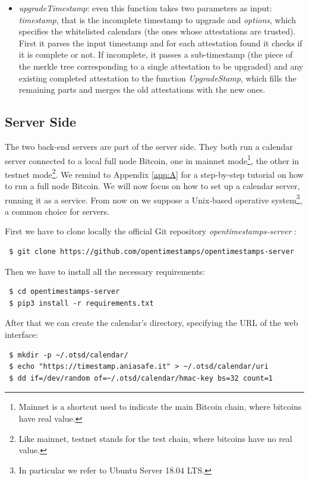\begin{itemize}
    \item \textit{upgradeTimestamp}: even this function takes two parameters as input: \textit{timestamp}, that is the incomplete timestamp to upgrade and \textit{options}, which specifies the whitelisted calendars (the ones whose attestations are trusted). First it parses the input timestamp and for each attestation found it checks if it is complete or not. If incomplete, it passes a sub-timestamp (the piece of the merkle tree corresponding to a single attestation to be upgraded) and any existing completed attestation to the function \textit{UpgradeStamp}, which fills the remaining parts and merges the old attestations with the new ones.
\end{itemize}

\bigskip
\subsection{Server Side}
\label{sec:server-side}
The two back-end servers are part of the server side. They both run a calendar server connected to a local full node Bitcoin, one in mainnet mode\footnote{Mainnet is a shortcut used to indicate the main Bitcoin chain, where bitcoins have real value.}, the other in testnet mode\footnote{Like mainnet, testnet stands for the test chain, where bitcoins have no real value.}. We remind to Appendix \ref{app:A} for a step-by-step tutorial on how to run a full node Bitcoin. We will now focus on how to set up a calendar server, running it as a service. From now on we suppose a Unix-based operative system\footnote{In particular we refer to Ubuntu Server 18.04 LTS.}, a common choice for servers.

\bigskip
\noindent
First we have to clone locally the official Git repository \textit{opentimestamps-server} \cite{OpenTimestampsGithub}:
\begin{lstlisting}
 $ git clone https://github.com/opentimestamps/opentimestamps-server
\end{lstlisting}

\bigskip
\noindent
Then we have to install all the necessary requirements:
\begin{lstlisting}
 $ cd opentimestamps-server
 $ pip3 install -r requirements.txt
\end{lstlisting}

\bigskip
\noindent
After that we can create the calendar's directory, specifying the URL of the web interface:
\begin{lstlisting}
 $ mkdir -p ~/.otsd/calendar/
 $ echo "https://timestamp.aniasafe.it" > ~/.otsd/calendar/uri
 $ dd if=/dev/random of=~/.otsd/calendar/hmac-key bs=32 count=1
\end{lstlisting}

